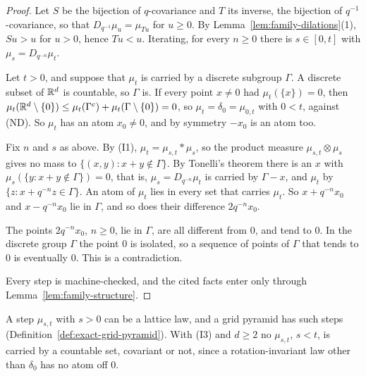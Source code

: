 \begin{proof}
Let $S$ be the bijection of $q$-covariance and $T$ its inverse, the bijection of
$q^{-1}$-covariance, so that $D_{q^{-1}}\mu_u = \mu_{Tu}$ for $u \ge 0$. By
Lemma~\ref{lem:family-dilations}(1), $Su > u$ for $u > 0$, hence $Tu < u$. Iterating, for every
$n \ge 0$ there is $s \in [0, t]$ with $\mu_s = D_{q^{-n}}\mu_t$.

Let $t > 0$, and suppose that $\mu_t$ is carried by a discrete subgroup $\Gamma$. A discrete subset
of $\mathbb{R}^d$ is countable, so $\Gamma$ is. If every point $x \ne 0$ had $\mu_t(\{x\}) = 0$, then
$\mu_t(\mathbb{R}^d \setminus \{0\}) \le \mu_t(\Gamma^c) + \mu_t(\Gamma \setminus \{0\}) = 0$, so
$\mu_t = \delta_0 = \mu_{0,t}$ with $0 < t$, against (ND). So $\mu_t$ has an atom $x_0 \ne 0$, and
by symmetry $-x_0$ is an atom too.

Fix $n$ and $s$ as above. By (I1), $\mu_t = \mu_{s,t} * \mu_s$, so the product measure
$\mu_{s,t} \otimes \mu_s$ gives no mass to $\{(x, y) : x + y \notin \Gamma\}$. By Tonelli's theorem
there is an $x$ with $\mu_s(\{y : x + y \notin \Gamma\}) = 0$, that is, $\mu_s = D_{q^{-n}}\mu_t$ is
carried by $\Gamma - x$, and $\mu_t$ by $\{z : x + q^{-n}z \in \Gamma\}$. An atom of $\mu_t$ lies in
every set that carries $\mu_t$. So $x + q^{-n}x_0$ and $x - q^{-n}x_0$ lie in $\Gamma$, and so does
their difference $2q^{-n}x_0$.

The points $2q^{-n}x_0$, $n \ge 0$, lie in $\Gamma$, are all different from $0$, and tend to $0$.
In the discrete group $\Gamma$ the point $0$ is isolated, so a sequence of points of $\Gamma$ that
tends to $0$ is eventually $0$. This is a contradiction.

Every step is machine-checked, and the cited facts enter only through
Lemma~\ref{lem:family-structure}.
\end{proof}

A step $\mu_{s,t}$ with $s > 0$ can be a lattice law, and a grid pyramid has such steps
(Definition~\ref{def:exact-grid-pyramid}). With (I3) and $d \ge 2$ no $\mu_{s,t}$, $s < t$, is
carried by a countable set, covariant or not, since a rotation-invariant law other than $\delta_0$
has no atom off $0$.

